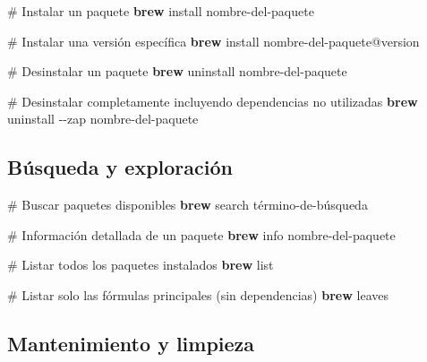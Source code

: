 \documentclass[
  11pt,
  letterpaper,
  oneside,
  openany]{scrbook}
\newenvironment{Shaded}{}{}
\newcommand{\AttributeTok}[1]{\textcolor[rgb]{0.84,0.23,0.29}{#1}}
\newcommand{\CommentTok}[1]{\textcolor[rgb]{0.42,0.45,0.49}{#1}}
\newcommand{\ExtensionTok}[1]{\textcolor[rgb]{0.84,0.23,0.29}{\textbf{#1}}}
\newcommand{\NormalTok}[1]{\textcolor[rgb]{0.14,0.16,0.18}{#1}}
\begin{document}
\begin{Shaded}
\begin{Highlighting}[]
\CommentTok{\# Instalar un paquete}
\ExtensionTok{brew}\NormalTok{ install nombre{-}del{-}paquete}

\CommentTok{\# Instalar una versión específica}
\ExtensionTok{brew}\NormalTok{ install nombre{-}del{-}paquete@version}

\CommentTok{\# Desinstalar un paquete}
\ExtensionTok{brew}\NormalTok{ uninstall nombre{-}del{-}paquete}

\CommentTok{\# Desinstalar completamente incluyendo dependencias no utilizadas}
\ExtensionTok{brew}\NormalTok{ uninstall }\AttributeTok{{-}{-}zap}\NormalTok{ nombre{-}del{-}paquete}
\end{Highlighting}
\end{Shaded}

\subsection{Búsqueda y exploración}\label{buxfasqueda-y-exploraciuxf3n}

\begin{Shaded}
\begin{Highlighting}[]
\CommentTok{\# Buscar paquetes disponibles}
\ExtensionTok{brew}\NormalTok{ search término{-}de{-}búsqueda}

\CommentTok{\# Información detallada de un paquete}
\ExtensionTok{brew}\NormalTok{ info nombre{-}del{-}paquete}

\CommentTok{\# Listar todos los paquetes instalados}
\ExtensionTok{brew}\NormalTok{ list}

\CommentTok{\# Listar solo las fórmulas principales (sin dependencias)}
\ExtensionTok{brew}\NormalTok{ leaves}
\end{Highlighting}
\end{Shaded}

\subsection{Mantenimiento y limpieza}\label{mantenimiento-y-limpieza}
\end{document}
